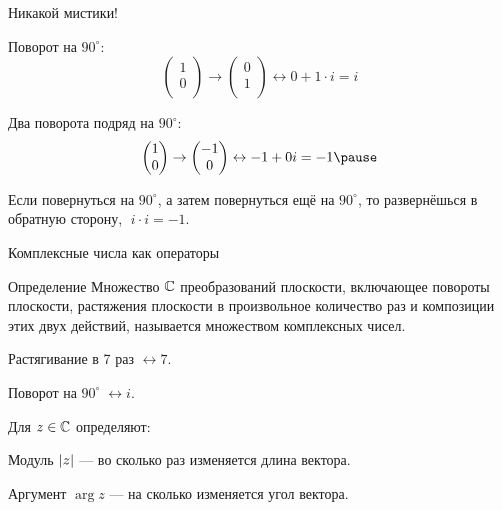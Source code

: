 \begin{frame}{Никакой мистики!}


    Поворот на $90^{\circ}$:
    \[
     \begin{pmatrix}
        1 \\
        0 \\
    \end{pmatrix} \to \begin{pmatrix}
        0 \\
        1 \\
    \end{pmatrix}   \leftrightarrow 0 + 1\cdot i = i 
    \]

    Два поворота подряд на $90^{\circ}$:
    \[
    \begin{pmatrix}
        1 \\
        0 \\
    \end{pmatrix} \to \begin{pmatrix}
        -1 \\
        0 \\
    \end{pmatrix} \leftrightarrow  -1 + 0i = -1  \pause
    \]

    Если повернуться на $90^{\circ}$, а затем повернуться ещё на $90^{\circ}$, то
        развернёшься в обратную сторону, $\; i \cdot i = -1$.

\end{frame}



\begin{frame}{Комплексные числа как операторы}

\begin{block}{Определение}
    Множество $\mathbb{C}$ преобразований плоскости, включающее повороты плоскости, 
    растяжения плоскости в произвольное количество раз и композиции этих двух действий,
    называется множеством \alert{комплексных чисел}.
\end{block}

\pause
Растягивание в 7 раз $\leftrightarrow 7$.

\pause
Поворот на $90^{\circ} \; \leftrightarrow i$.

\pause
Для $z\in\mathbb{C}$ определяют:

Модуль $\abs{z}$ — во сколько раз изменяется длина вектора. 

Аргумент $\arg{z}$ — на сколько изменяется угол вектора. 

\end{frame}
    


